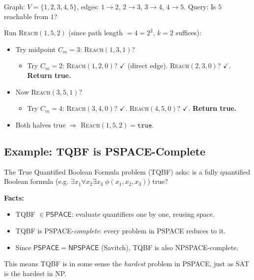 \documentclass[12pt,a4paper]{article}
\theoremstyle{plain}
\theoremstyle{definition}
\theoremstyle{remark}
\newcommand{\PSPACE}{\mathsf{PSPACE}}
\newcommand{\NPSPACE}{\mathsf{NPSPACE}}
\begin{document}
\begin{examplebox}
Graph: $V = \{1,2,3,4,5\}$, edges: $1\to2$, $2\to3$, $3\to4$, $4\to5$. Query: Is $5$ reachable from $1$?

\begin{center}
\end{center}

Run \textsc{Reach}$(1, 5, 2)$ (since path length $= 4 = 2^2$, $k=2$ suffices):

\begin{itemize}
  \item Try midpoint $C_m = 3$: \textsc{Reach}$(1,3,1)$?
  \begin{itemize}
    \item Try $C_m = 2$: \textsc{Reach}$(1,2,0)$? $\checkmark$ (direct edge). \textsc{Reach}$(2,3,0)$? $\checkmark$. \textbf{Return true.}
  \end{itemize}
  \item Now \textsc{Reach}$(3,5,1)$?
  \begin{itemize}
    \item Try $C_m = 4$: \textsc{Reach}$(3,4,0)$? $\checkmark$. \textsc{Reach}$(4,5,0)$? $\checkmark$. \textbf{Return true.}
  \end{itemize}
  \item Both halves true $\Rightarrow$ \textsc{Reach}$(1,5,2) = \texttt{true}$. \checkmark
\end{itemize}
\end{examplebox}

\subsection{Example: TQBF is PSPACE-Complete}

\begin{examplebox}
The True Quantified Boolean Formula problem (TQBF) asks: is a fully quantified Boolean formula (e.g. $\exists x_1 \forall x_2 \exists x_3 \; \phi(x_1,x_2,x_3)$) true?

\textbf{Facts:}
\begin{itemize}
  \item TQBF $\in \PSPACE$: evaluate quantifiers one by one, reusing space.
  \item TQBF is PSPACE-\emph{complete}: every problem in PSPACE reduces to it.
  \item Since $\PSPACE = \NPSPACE$ (Savitch), TQBF is also NPSPACE-complete.
\end{itemize}

This means TQBF is in some sense the \emph{hardest} problem in PSPACE, just as SAT is the hardest in NP.
\end{examplebox}
\end{document}
